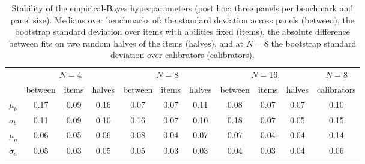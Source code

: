 \begin{table}[tbp]
\centering\footnotesize
\caption{Stability of the empirical-Bayes hyperparameters (post hoc; three panels per benchmark and panel size). Medians over benchmarks of: the standard deviation across panels (between), the bootstrap standard deviation over items with abilities fixed (items), the absolute difference between fits on two random halves of the items (halves), and at $N=8$ the bootstrap standard deviation over calibrators (calibrators).}
\label{tab:ebstab}
\setlength{\tabcolsep}{3pt}
\begin{tabular}{@{}lccccccccc c@{}}
\toprule
 & \multicolumn{3}{c}{$N=4$} & \multicolumn{3}{c}{$N=8$} & \multicolumn{3}{c}{$N=16$} & $N=8$ \\
\cmidrule(lr){2-4}\cmidrule(lr){5-7}\cmidrule(lr){8-10}\cmidrule(l){11-11}
 & between & items & halves & between & items & halves & between & items & halves & calibrators \\
\midrule
$\mu_b$ & 0.17 & 0.09 & 0.16 & 0.07 & 0.07 & 0.11 & 0.08 & 0.07 & 0.07 & 0.10 \\
$\sigma_b$ & 0.11 & 0.09 & 0.10 & 0.16 & 0.07 & 0.10 & 0.18 & 0.07 & 0.05 & 0.15 \\
$\mu_a$ & 0.06 & 0.05 & 0.06 & 0.08 & 0.04 & 0.07 & 0.07 & 0.04 & 0.04 & 0.14 \\
$\sigma_a$ & 0.05 & 0.03 & 0.05 & 0.05 & 0.03 & 0.03 & 0.04 & 0.03 & 0.04 & 0.06 \\
\bottomrule
\end{tabular}
\end{table}
